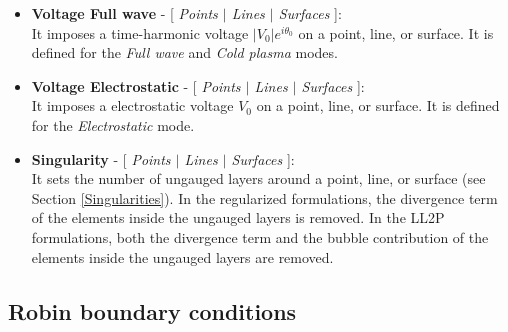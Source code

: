 \begin{itemize}
    The \textbf{Front} and \textbf{Right} surfaces are defined as slave surfaces, while the \textbf{Back} and \textbf{Left} surfaces act as master surfaces. This means that the fields are computed using the master surfaces, and the values on the slave surfaces are then expressed as a function of the master surfaces fields after the global linear system has been solved, according to
    \begin{equation}\label{EPBCs}
	    \begin{aligned}
		    \mathbf{E}_f &= \,\mathbf{E}_b \,\, e^{i(\Psi_f - \Psi_b)}, 
		    \\
		    \mathbf{E}_r &= \,\mathbf{E}_l \,\, e^{i(\Psi_r - \Psi_l)},
	    \end{aligned}
    \end{equation}
    where the subscripts $f$, $b$, $r$, and $l$ refer to the front, back, right, and left surfaces, respectively, and $\Psi$ denotes the phase of the fields on each surface. For the $\mathbf{A}-\phi$ potential formulation, the phase difference is applied to both the vector potential $\mathbf{A}$ and the scalar potential $\phi$.
    \\
	\item \textbf{Voltage Full wave} - [ \textit{Points $\mid$ Lines $\mid$ Surfaces} ]:\\ 
	It imposes a time-harmonic voltage $|V_{0}|e^{i\theta_{0}}$ on a point, line, or surface. It is defined for the \textit{Full wave} and \textit{Cold plasma} modes.
    \\
	\item \textbf{Voltage Electrostatic} - [ \textit{Points $\mid$ Lines $\mid$ Surfaces} ]:\\
	It imposes a electrostatic voltage $V_{0}$ on a point, line, or surface. It is defined for the \textit{Electrostatic} mode.
	\\
	\item \textbf{Singularity} - [ \textit{Points $\mid$ Lines $\mid$ Surfaces} ]:\\
	It sets the number of ungauged layers around a point, line, or surface (see Section \ref{Singularities}). In the regularized formulations, the divergence term of the elements inside the ungauged layers is removed. In the LL2P formulations, both the divergence term and the bubble contribution of the elements inside the ungauged layers are removed.
\end{itemize}

\subsection{Robin boundary conditions}

